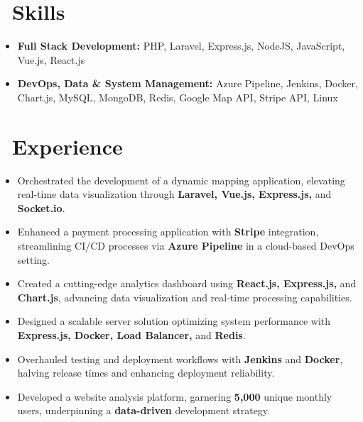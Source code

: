 \documentclass{resume}
\begin{document}



\section{\faCogs\ Skills}
\begin{itemize}[parsep=0.5ex]
  \item \textbf{Full Stack Development:} PHP, Laravel, Express.js, NodeJS, JavaScript, Vue.js, React.js
  \item \textbf{DevOps, Data & System Management:} Azure Pipeline, Jenkins, Docker, Chart.js, MySQL, MongoDB, Redis, Google Map API, Stripe API, Linux
\end{itemize}


\section{\faUsers\ Experience}
\role{Software Developer}{Full-time}
\begin{itemize}
 \item Orchestrated the development of a dynamic mapping application, elevating real-time data visualization through \textbf{Laravel, Vue.js, Express.js,} and \textbf{Socket.io}.
 \item Enhanced a payment processing application with \textbf{Stripe} integration, streamlining CI/CD processes via \textbf{Azure Pipeline} in a cloud-based DevOps setting.
 \item Created a cutting-edge analytics dashboard using \textbf{React.js, Express.js,} and \textbf{Chart.js}, advancing data visualization and real-time processing capabilities.
 \item Designed a scalable server solution optimizing system performance with \textbf{Express.js, Docker, Load Balancer,} and \textbf{Redis}.
 \item Overhauled testing and deployment workflows with \textbf{Jenkins} and \textbf{Docker}, halving release times and enhancing deployment reliability.
 \item Developed a website analysis platform, garnering \textbf{5,000} unique monthly users, underpinning a \textbf{data-driven} development strategy.
\end{itemize}
\end{document}
